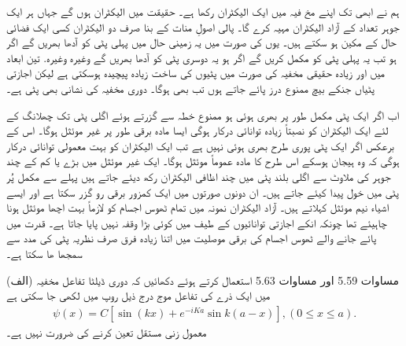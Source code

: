  ہم نے ابھی تک اپنے مخ فیہ میں ایک الیکٹران رکھا ہے۔ حقیقت میں  الیکٹران ہوں گے جہاں ہر ایک جوہر  تعداد کے آزاد الیکٹران مہیہ کرے گا۔ پالی اصولِ منات کے بنا صرف دو الیکٹران کسی ایک فضائی حال کے مکین ہو سکتے ہیں۔ یوں   کی صورت میں یہ زمینی حال میں پہلی پٹی کو آدھا  بھریں گے اگر   ہو تب یہ پہلی پٹی کو مکمل کریں گے اگر  ہو یہ دوسری پٹی کو آدھا بھریں گے وغیرہ وغیرہ. تین ابعاد میں اور زیادہ حقیقی مخفیہ کی صورت میں پٹیوں کی ساخت زیادہ پیچیدہ ہوسکتی ہے لیکن اجازتی پٹیاں جنکے بیچ ممنوع درز پائے جاتے ہوں تب بھی ہوگا۔ دوری مخفیہ کی نشانی بھی پٹی ہے۔
 
 اب اگر ایک پٹی مکمل طور پر بھری ہوئی ہو ممنوع خطہ سے گزرتے ہوئے اگلی پٹی تک چھلانگ کے لئے ایک الیکٹران کو نصبتاً زیادہ توانائی درکار ہوگی ایسا مادہ برقی طور پر غیر موئثل ہوگا۔ اس کے برعکس اگر ایک پٹی پوری طرح بھری ہوئی نہیں ہے تب ایک الیکٹران کو بہت معمولی توانائی درکار ہوگی کہ وہ ہیجان ہوسکے  اس طرح کا مادہ عموماً موئثل ہوگا۔ ایک غیر موئثل میں بڑے یا کم  کے چند جوہر کی ملاوٹ سے اگلی بلند پٹی میں چند اظافی الیکٹران رکھ دیئے جاتے ہیں پہلے سے مکمل پُر پٹی میں خول پیدا کیئے جاتے ہیں۔ ان دونوں صورتوں میں ایک کمزور برقی رو گزر سکتا ہے اور ایسے اشیاء نیم موئثل کہلاتے ہیں۔ آزاد الیکٹران نمونہ میں تمام ٹھوس اجسام کو لازماً بہت اچھا موئثل ہونا چاہیئے تھا چونکہ انکے اجازتی توانائیوں کے طیف میں کوئی بڑا وقفہ نہیں پایا جاتا ہے۔ قدرت میں پائے جانے والے ٹھوس اجسام کی برقی موصلیت میں اتنا زیادہ فرق صرف نظریہ پٹی کی مدد سے سمجھا ھا سکتا ہے۔  


(الف) مساوات \num{5.59} اور مساوات \num{5.63} استعمال کرتے ہوئے دکھائیں کہ دوری ڈیلٹا تفاعل مخفیہ میں ایک ذرے کی تفاعل موج درج ذیل روپ میں لکھی جا سکتی ہے 
\begin{align*}
	\psi(x) = C[\sin(kx)+e^{-iKa}\sin k(a-x)], (0\leq x\leq a).
\end{align*} 
معمول زنی مستقل  تعین کرنے کی ضرورت نہیں ہے۔


